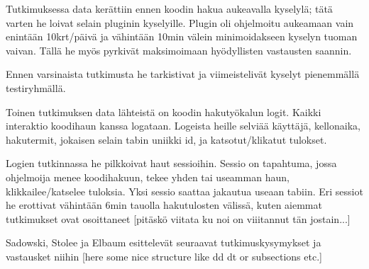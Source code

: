 \documentclass[finnish]{../tktltiki2}
\theoremstyle{definition}
\theoremstyle{remark}
\begin{document}
Tutkimuksessa data kerättiin ennen koodin hakua aukeavalla kyselylä; tätä varten he loivat selain pluginin kyselyille. Plugin oli ohjelmoitu aukeamaan vain enintään 10krt/päivä ja vähintään 10min välein minimoidakseen kyselyn tuoman vaivan. Tällä he myös pyrkivät maksimoimaan hyödyllisten vastausten saannin.

Ennen varsinaista tutkimusta he tarkistivat ja viimeistelivät kyselyt pienemmällä testiryhmällä.

Toinen tutkimuksen data lähteistä on koodin hakutyökalun logit. Kaikki interaktio koodihaun kanssa logataan. Logeista heille selviää käyttäjä, kellonaika, hakutermit, jokaisen selain tabin uniikki id, ja katsotut/klikatut tulokset.

Logien tutkinnassa he pilkkoivat haut sessioihin. Sessio on tapahtuma, jossa ohjelmoija menee koodihakuun, tekee yhden tai useamman haun, klikkailee/katselee tuloksia. Yksi sessio saattaa jakautua useaan tabiin. Eri sessiot he erottivat vähintään 6min tauolla hakutulosten välissä, kuten aiemmat tutkimukset ovat osoittaneet [pitäskö viitata ku noi on viiitannut tän jostain...]



Sadowski, Stolee ja Elbaum esittelevät seuraavat tutkimuskysymykset ja vastausket niihin
[here some nice structure like dd dt or subsections etc.]





%
%
% 
%







%
\end{document}
